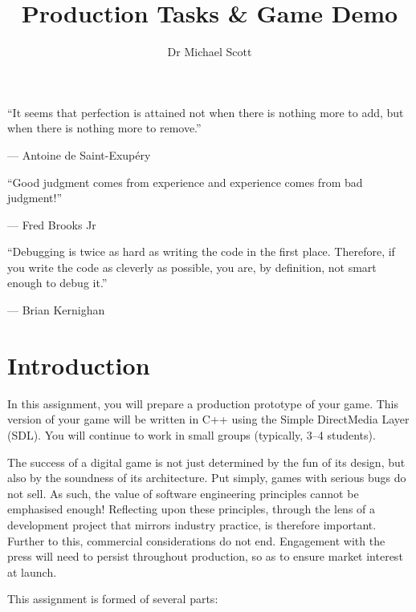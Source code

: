 \documentclass{../fal_assignment}
\title{Production Tasks \& Game Demo}
\author{Dr Michael Scott}
\begin{document}
\maketitle

\begin{marginquote}
    ``It seems that perfection is attained not when there is nothing more to add,
        but when there is nothing more to remove.''
    
    --- Antoine de Saint-Exup\'ery
    
    \marginquoterule
    
    ``Good judgment comes from experience and experience comes from bad judgment!''
    
    --- Fred Brooks Jr
    
    \marginquoterule
    
    ``Debugging is twice as hard as writing the code in the first place.
     Therefore, if you write the code as cleverly as possible, you are, by definition, not smart enough to debug it.'' 
 
         --- Brian Kernighan
     
\end{marginquote}

\section*{Introduction}

In this assignment, you will prepare a production prototype of your game. This version of your game will be written in C++ using the Simple DirectMedia Layer (SDL). You will continue to work in small groups (typically, 3--4 students).

The success of a digital game is not just determined by the fun of its design, but also by the soundness of its architecture. Put simply, games with serious bugs do not sell. As such, the value of software engineering principles cannot be emphasised enough! Reflecting upon these principles, through the lens of a development project that mirrors industry practice, is therefore important. Further to this, commercial considerations do not end. Engagement with the press will need to persist throughout production, so as to ensure market interest at launch.

This assignment is formed of several parts:
\end{document}
